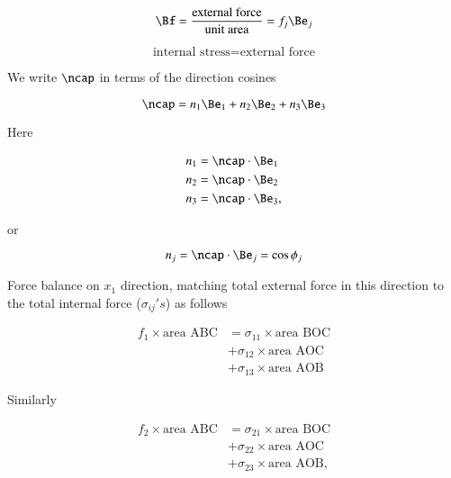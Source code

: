 \begin{equation}\label{eqn:continuumL4:150}
\Bf = \frac{\text{external force}}{\text{unit area}} = f_j \Be_j
\end{equation}

\begin{equation}\label{eqn:continuumL4:170}
\text{internal stress} = \text{external force}
\end{equation}

We write $\ncap$ in terms of the direction cosines

\begin{equation}\label{eqn:continuumL4:190}
\ncap = 
n_1 \Be_1 + 
n_2 \Be_2 + 
n_3 \Be_3 
\end{equation}

Here 

\begin{align}\label{eqn:continuumL4:210}
n_1 &= \ncap \cdot \Be_1 \\
n_2 &= \ncap \cdot \Be_2 \\
n_3 &= \ncap \cdot \Be_3,
\end{align}

or 

\begin{equation}\label{eqn:continuumL4:230}
n_j = \ncap \cdot \Be_j = \cos\phi_j
\end{equation}

Force balance on $x_1$ direction, matching total external force in this direction to the total internal force ($\sigma_{ij}'s$) as follows

\begin{equation}\label{eqn:continuumL4:250}
\begin{aligned}
f_1 \times \text{area ABC} 
&= 
\sigma_{11} \times \text{area BOC} \\
&+\sigma_{12} \times \text{area AOC} \\
&+\sigma_{13} \times \text{area AOB}
\end{aligned}
\end{equation}

Similarly

\begin{equation}\label{eqn:continuumL4:270}
\begin{aligned}
f_2 \times \text{area ABC} 
&= 
\sigma_{21} \times \text{area BOC} \\
&+\sigma_{22} \times \text{area AOC} \\
&+\sigma_{23} \times \text{area AOB},
\end{aligned}
\end{equation}

